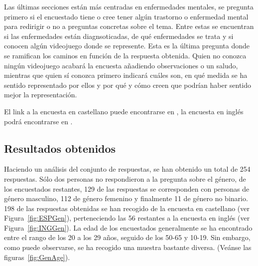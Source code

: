 \documentclass[12pt, a4paper,twoside,titlepage]{book}
\begin{document}
Las últimas secciones están más centradas en enfermedades mentales, se pregunta primero si el encuestado tiene o cree tener algún trastorno o enfermedad mental para redirigir o no a preguntas concretas sobre el tema. Entre estas se encuentran si las enfermedades están diagnsoticadas, de qué enfermedades se trata y si conocen algún videojuego donde se represente. Esta es la última pregunta donde se ramifican los caminos en función de la respuesta obtenida. Quien no conozca ningún videojuego acabará la encuesta añadiendo observaciones o un saludo, mientras que quien sí conozca primero indicará cuáles son, en qué medida se ha sentido representado por ellos y por qué y cómo creen que podrían haber sentido mejor la representación. 


El link a la encuesta en castellano puede encontrarse en , la encuesta en inglés podrá encontrarse en .

\subsection{Resultados obtenidos}


Haciendo un análisis del conjunto de respuestas, se han obtenido un total de 254 respuestas. Sólo dos personas no respondieron a la pregunta sobre el género, de los encuestados restantes, 129 de las respuestas se corresponden con personas de género masculino, 112 de género femenino y finalmente 11 de género no binario. 198 de las respuestas obtenidas se han recogido de la encuesta en castellano (ver Figura~\ref{fig:ESPGen}), perteneciendo las 56 restantes a la encuesta en inglés (ver Figura~\ref{fig:INGGen}). 
La edad de los encuestados generalmente se ha encontrado entre el rango de los 20 a los 29 años, seguido de los 50-65 y 10-19. Sin embargo, como puede observarse, se ha recogido una muestra bastante diversa. (Veánse las figuras~\ref{fig:GenAge}). 
\end{document}

